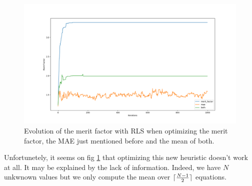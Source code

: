 \documentclass[a4paper,11pt,openany]{article}
\DeclarePairedDelimiter{\ceil}{\lceil}{\rceil}
\begin{document}
\begin{figure}[H]
\begin{center}
\includegraphics[scale=0.22]{Images/rls_both_heuristics}
\caption{Evolution of the merit factor with RLS when optimizing the merit factor, the MAE just mentioned before and the mean of both.}
\label{fig:rls_both_heuristics}
\end{center}
\end{figure}
\noindent
Unfortunetely, it seems on fig \ref{fig:rls_both_heuristics} that optimizing this new heuristic doesn't work at all. It may be explained by the lack of information. Indeed, we have $N$ unkwnown values but we only compute the mean over $\ceil{\frac{N-1}{2}}$ equations.\\
\end{document}
